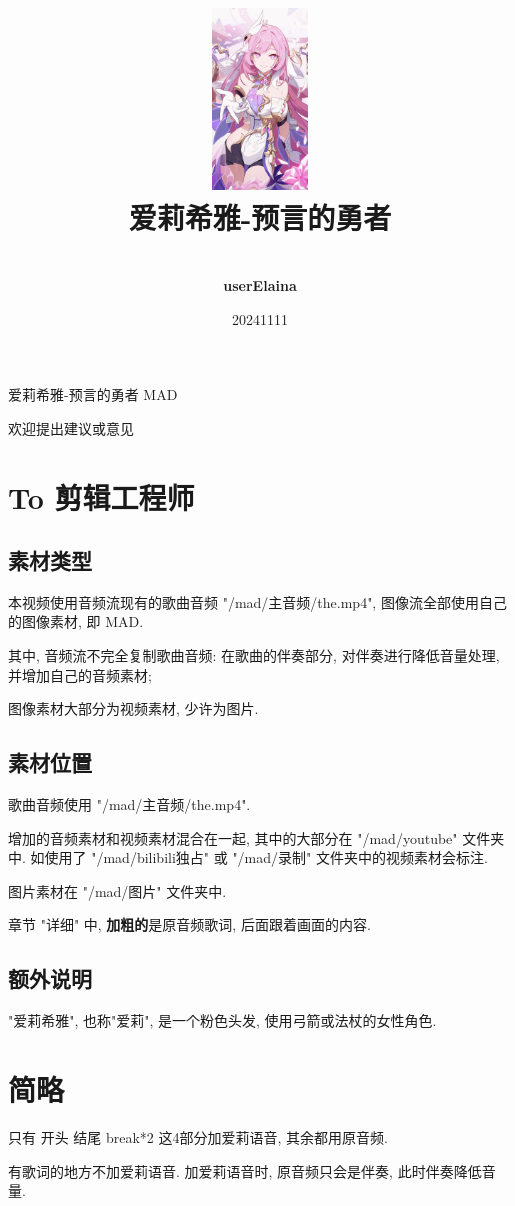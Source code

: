 \documentclass[a4paper]{article}
\title{
    \vspace*{1.0in}
    \includegraphics[width=1in]{figures/100154449_p0.jpg} \\
    \vspace*{1in}
    \textbf{\Huge 爱莉希雅-预言的勇者}
    \vspace{0.5in}
}
\author{ \\
    \textbf{\huge userElaina} \\
    \vspace*{1in}
}
\date{\LARGE 20241111}
\begin{document}
\LARGE

\maketitle
\tableofcontents
\thispagestyle{empty}
\newpage

爱莉希雅-预言的勇者 MAD

欢迎提出建议或意见

\section{To 剪辑工程师}

\subsection{素材类型}

本视频使用音频流现有的歌曲音频 "/mad/主音频/the.mp4", 图像流全部使用自己的图像素材, 即 MAD.

其中, 音频流不完全复制歌曲音频: 在歌曲的伴奏部分, 对伴奏进行降低音量处理, 并增加自己的音频素材;

图像素材大部分为视频素材, 少许为图片.

\subsection{素材位置}

歌曲音频使用 "/mad/主音频/the.mp4".

增加的音频素材和视频素材混合在一起, 其中的大部分在 "/mad/youtube" 文件夹中. 如使用了 "/mad/bilibili独占" 或 "/mad/录制" 文件夹中的视频素材会标注.

图片素材在 "/mad/图片" 文件夹中.

章节 "详细" 中, \textbf{加粗的}是原音频歌词, 后面跟着画面的内容.

\subsection{额外说明}

"爱莉希雅", 也称"爱莉", 是一个粉色头发, 使用弓箭或法杖的女性角色.

\section{简略}

只有 开头 结尾 break*2 这4部分加爱莉语音, 其余都用原音频.

有歌词的地方不加爱莉语音. 加爱莉语音时, 原音频只会是伴奏, 此时伴奏降低音量.
\end{document}
